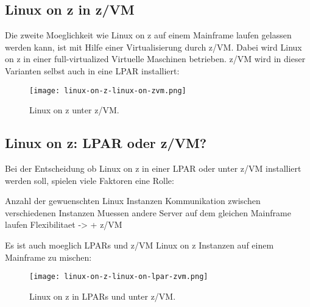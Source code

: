 \subsection{Linux on z in z/VM}

Die zweite Moeglichkeit wie Linux on z auf einem Mainframe laufen gelassen werden kann, ist mit Hilfe einer Virtualisierung durch z/VM. Dabei wird Linux on z in einer full-virtualized Virtuelle Maschinen betrieben. z/VM wird in dieser Varianten selbst auch in eine LPAR installiert:

\begin{figure}[h!]
\centering
\texttt{[image: linux-on-z-linux-on-zvm.png]}
\caption{Linux on z unter z/VM\cite{LinuxOnZOnZVM}.}
\label{fig:LinuxOnZOnZVM}
\end{figure}

\subsection{Linux on z: LPAR oder z/VM?}

Bei der Entscheidung ob Linux on z in einer LPAR oder unter z/VM installiert werden soll, spielen viele Faktoren eine Rolle:

Anzahl der gewuenschten Linux Instanzen
Kommunikation zwischen verschiedenen Instanzen
Muessen andere Server auf dem gleichen Mainframe laufen
Flexibilitaet -> + z/VM

Es ist auch moeglich LPARs und z/VM Linux on z Instanzen auf einem Mainframe zu mischen:

\begin{figure}[ht!]
\centering
\texttt{[image: linux-on-z-linux-on-lpar-zvm.png]}
\caption{Linux on z in LPARs und unter z/VM\cite{LinuxOnZOnLPARZVM}.}
\label{fig:LinuxOnZOnLPARZVM}
\end{figure}
